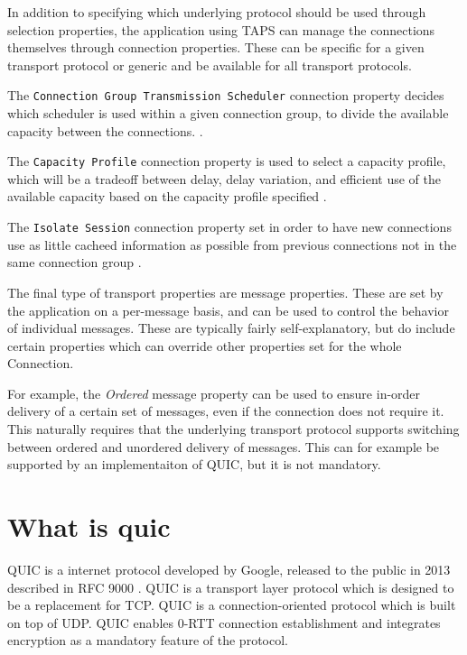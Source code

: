 In addition to specifying which underlying protocol should be
used through selection properties, the application using TAPS
can manage the connections
themselves through connection properties. These can be specific
for a given transport protocol
or generic and be available for all transport protocols.

The \texttt{Connection Group Transmission Scheduler} connection 
property decides which scheduler is used within a given
connection group, to divide the available capacity between the
connections. \cite{paulyArchitectureRequirementsTransport2025}.

The \texttt{Capacity Profile} connection property is used to
select a capacity profile, which will be a tradeoff between
delay, delay variation, and efficient use of the available
capacity based on the capacity profile specified
\cite{paulyArchitectureRequirementsTransport2025}.

The \texttt{Isolate Session} connection property set in order to
have new connections use as little cacheed information as
possible from previous connections not in the same connection
group \cite{paulyArchitectureRequirementsTransport2025}.

The final type of transport properties are message properties.
These are set by the application on a per-message basis, and
can be used to control the behavior of individual messages.
These are typically fairly self-explanatory, but do
include certain properties which can override other properties
set for the whole Connection.

For example, the \textit{Ordered}
message property can be used to ensure in-order delivery
of a certain set of messages, even if the connection
does not require it. This naturally requires that the underlying
transport protocol supports switching between ordered and
unordered delivery of messages. This can for example be
supported by an implementaiton of QUIC, but it is not mandatory.

\section{What is quic}

QUIC is a internet protocol developed by Google, released to the
public in 2013 described in RFC 9000
\cite{iyengarQUICUDPBasedMultiplexed2021}. QUIC is a transport
layer protocol which is designed to be a replacement for TCP.
QUIC is a connection-oriented protocol which is built on top of
UDP. QUIC enables 0-RTT connection establishment and integrates
encryption as a mandatory feature of the protocol.

